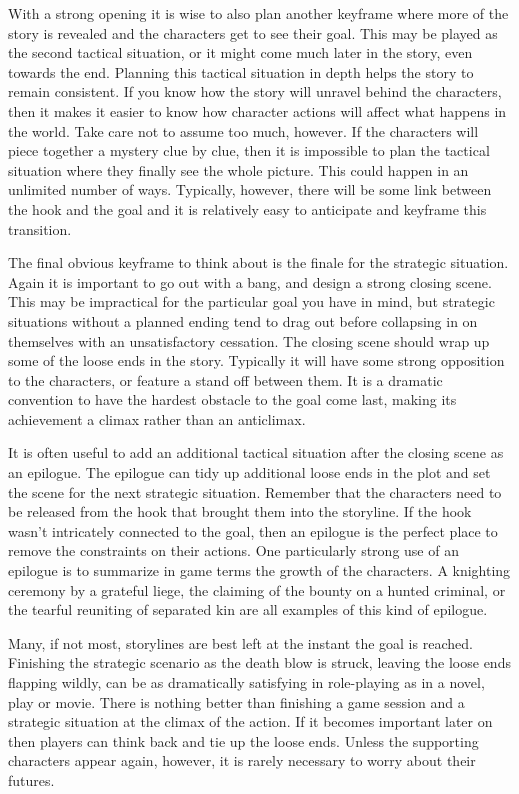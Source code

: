 \documentclass[twoside]{book}
\begin{document}
With a strong opening it is wise to also plan another keyframe where
more of the story is revealed and the characters get to see their
goal. This may be played as the second tactical situation, or it might
come much later in the story, even towards the end. Planning this
tactical situation in depth helps the story to remain consistent. If
you know how the story will unravel behind the characters, then it
makes it easier to know how character actions will affect what happens
in the world. Take care not to assume too much, however. If the
characters will piece together a mystery clue by clue, then it is
impossible to plan the tactical situation where they finally see the
whole picture. This could happen in an unlimited number of
ways. Typically, however, there will be some link between the hook and
the goal and it is relatively easy to anticipate and keyframe this
transition.

The final obvious keyframe to think about is the finale for the
strategic situation. Again it is important to go out with a bang, and
design a strong closing scene. This may be impractical for the
particular goal you have in mind, but strategic situations without a
planned ending tend to drag out before collapsing in on themselves
with an unsatisfactory cessation. The closing scene should wrap up
some of the loose ends in the story. Typically it will have some
strong opposition to the characters, or feature a stand off between
them. It is a dramatic convention to have the hardest obstacle to the
goal come last, making its achievement a climax rather than an
anticlimax.

It is often useful to add an additional tactical situation after the
closing scene as an epilogue. The epilogue can tidy up additional
loose ends in the plot and set the scene for the next strategic
situation. Remember that the characters need to be released from the
hook that brought them into the storyline. If the hook wasn't
intricately connected to the goal, then an epilogue is the perfect
place to remove the constraints on their actions. One particularly
strong use of an epilogue is to summarize in game terms the growth of
the characters. A knighting ceremony by a grateful liege, the claiming
of the bounty on a hunted criminal, or the tearful reuniting of
separated kin are all examples of this kind of epilogue.

Many, if not most, storylines are best left at the instant the goal is
reached. Finishing the strategic scenario as the death blow is struck,
leaving the loose ends flapping wildly, can be as dramatically
satisfying in role-playing as in a novel, play or movie. There is
nothing better than finishing a game session and a strategic situation
at the climax of the action. If it becomes important later on then
players can think back and tie up the loose ends. Unless the
supporting characters appear again, however, it is rarely necessary to
worry about their futures.
\end{document}
